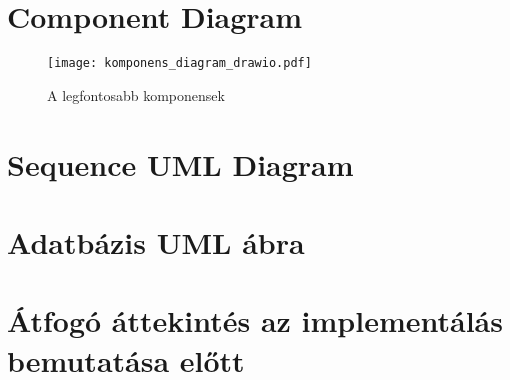 

\section{Component Diagram}

\begin{figure}[hbt] 
	\centering
	\texttt{[image: komponens\_diagram\_drawio.pdf]}
	\caption{A legfontosabb komponensek}
	\label{fig:komponens_diagram}
\end{figure}

\section{Sequence UML Diagram}
\section{Adatbázis UML ábra}

\section{Átfogó áttekintés az implementálás bemutatása előtt}